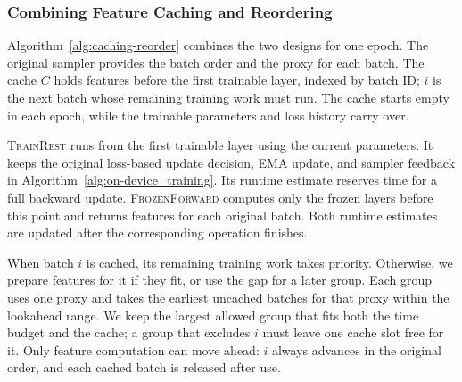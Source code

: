 \begingroup
\color{blue}
\subsubsection{Combining Feature Caching and Reordering}
\label{subsec:caching-reorder-algorithm}

Algorithm~\ref{alg:caching-reorder} combines the two designs for one epoch.
The original sampler provides the batch order and the proxy for each batch.
The cache $C$ holds features before the first trainable layer, indexed by batch ID; $i$ is the next batch whose remaining training work must run.
The cache starts empty in each epoch, while the trainable parameters and loss history carry over.

\textsc{TrainRest} runs from the first trainable layer using the current parameters.
It keeps the original loss-based update decision, EMA update, and sampler feedback in Algorithm~\ref{alg:on-device_training}.
Its runtime estimate reserves time for a full backward update.
\textsc{FrozenForward} computes only the frozen layers before this point and returns features for each original batch.
Both runtime estimates are updated after the corresponding operation finishes.



When batch $i$ is cached, its remaining training work takes priority.
Otherwise, we prepare features for it if they fit, or use the gap for a later group.
Each group uses one proxy and takes the earliest uncached batches for that proxy within the lookahead range.
We keep the largest allowed group that fits both the time budget and the cache; a group that excludes $i$ must leave one cache slot free for it.
Only feature computation can move ahead: $i$ always advances in the original order, and each cached batch is released after use.
\par
\endgroup
